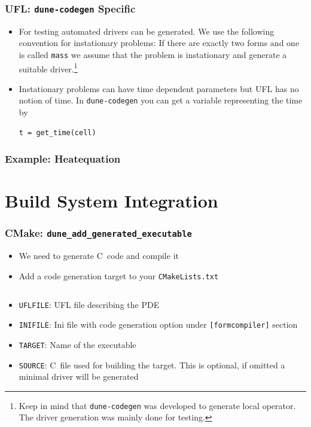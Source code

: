 \documentclass[aspectratio=169,11pt]{beamer}
\theoremstyle{definition}
\def\CC{{C\nolinebreak[4]\hspace{-.05em}\raisebox{.4ex}{\tiny\bf ++}}}
\begin{document}
\begin{frame}[fragile]
  \frametitle{UFL: \lstinline{dune-codegen} Specific}
  \begin{itemize}
  \item For testing automated drivers can be generated. We use the following
    convention for instationary problems: If there are exactly two forms and
    one is called \lstinline{mass} we assume that the problem is instationary
    and generate a suitable driver.\footnote{Keep in mind that
      \lstinline{dune-codegen} was developed to generate local operator. The
      driver generation was mainly done for testing.}
  \item Instationary problems can have time dependent parameters but UFL has no
    notion of time. In \lstinline{dune-codegen} you can get a variable
    representing the time by
    \begin{lstlisting}[basicstyle=\scriptsize, backgroundcolor=\color{listingbg}]
t = get_time(cell)
    \end{lstlisting}
    \end{itemize}
\end{frame}

\begin{frame}
  \frametitle{Example: Heatequation}
  
\end{frame}


\section{Build System Integration}

\begin{frame}[fragile]
  \frametitle{CMake: \lstinline{dune_add_generated_executable}}

  \begin{itemize}
  \item We need to generate \CC\ code and compile it
  \item Add a code generation target to your \lstinline{CMakeLists.txt}
    \inputminted[fontsize=\scriptsize]{cmake}{generated_executable.txt}
  \item \lstinline{UFLFILE}: UFL file describing the PDE
  \item \lstinline{INIFILE}: Ini file with code generation option under \lstinline{[formcompiler]} section
  \item \lstinline{TARGET}: Name of the executable
  \item \lstinline{SOURCE}: \CC\ file used for building the target. This is
    optional, if omitted a minimal driver will be generated
  \end{itemize}
\end{frame}
\end{document}
